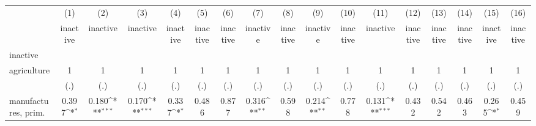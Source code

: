 {
\def\sym#1{\ifmmode^{#1}\else\(^{#1}\)\fi}
\begin{tabular}{l*{16}{c}}
\hline\hline
                    &\multicolumn{1}{c}{(1)}&\multicolumn{1}{c}{(2)}&\multicolumn{1}{c}{(3)}&\multicolumn{1}{c}{(4)}&\multicolumn{1}{c}{(5)}&\multicolumn{1}{c}{(6)}&\multicolumn{1}{c}{(7)}&\multicolumn{1}{c}{(8)}&\multicolumn{1}{c}{(9)}&\multicolumn{1}{c}{(10)}&\multicolumn{1}{c}{(11)}&\multicolumn{1}{c}{(12)}&\multicolumn{1}{c}{(13)}&\multicolumn{1}{c}{(14)}&\multicolumn{1}{c}{(15)}&\multicolumn{1}{c}{(16)}\\
                    &\multicolumn{1}{c}{inactive}&\multicolumn{1}{c}{inactive}&\multicolumn{1}{c}{inactive}&\multicolumn{1}{c}{inactive}&\multicolumn{1}{c}{inactive}&\multicolumn{1}{c}{inactive}&\multicolumn{1}{c}{inactive}&\multicolumn{1}{c}{inactive}&\multicolumn{1}{c}{inactive}&\multicolumn{1}{c}{inactive}&\multicolumn{1}{c}{inactive}&\multicolumn{1}{c}{inactive}&\multicolumn{1}{c}{inactive}&\multicolumn{1}{c}{inactive}&\multicolumn{1}{c}{inactive}&\multicolumn{1}{c}{inactive}\\
\hline
inactive            &                     &                     &                     &                     &                     &                     &                     &                     &                     &                     &                     &                     &                     &                     &                     &                     \\
agriculture         &           1         &           1         &           1         &           1         &           1         &           1         &           1         &           1         &           1         &           1         &           1         &           1         &           1         &           1         &           1         &           1         \\
                    &         (.)         &         (.)         &         (.)         &         (.)         &         (.)         &         (.)         &         (.)         &         (.)         &         (.)         &         (.)         &         (.)         &         (.)         &         (.)         &         (.)         &         (.)         &         (.)         \\
[1em]
manufactures, prim. &       0.397\sym{*}  &       0.180\sym{***}&       0.170\sym{***}&       0.337\sym{*}  &       0.486         &       0.877         &       0.316\sym{**} &       0.598         &       0.214\sym{**} &       0.778         &       0.131\sym{***}&       0.432         &       0.542         &       0.463         &       0.265\sym{*}  &       0.459         \\

\end{tabular}}
